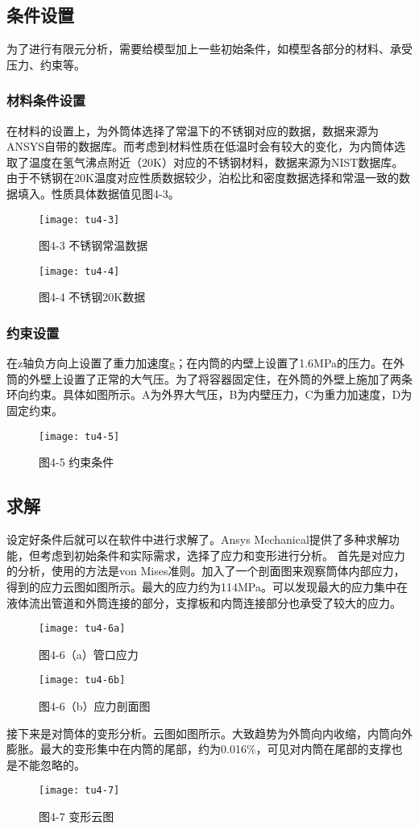 \documentclass[UTF8,a4paper]{ctexart}
\newcommand{\upcite}[1]{\textsuperscript{\textsuperscript{\cite{#1}}}}
\begin{document}
	\subsection{条件设置}
	为了进行有限元分析，需要给模型加上一些初始条件，如模型各部分的材料、承受压力、约束等。
	\subsubsection{材料条件设置}
	在材料的设置上，为外筒体选择了常温下的不锈钢对应的数据，数据来源为ANSYS自带的数据库。而考虑到材料性质在低温时会有较大的变化，为内筒体选取了温度在氢气沸点附近（20K）对应的不锈钢材料，数据来源为NIST数据库\upcite{ref21}。由于不锈钢在20K温度对应性质数据较少，泊松比和密度数据选择和常温一致的数据填入。性质具体数据值见图4-3。
	\begin{figure}[H]
		\centering
		\texttt{[image: tu4-3]}
		\caption*{图4-3 不锈钢常温数据}
		\label{fig:tu4-3}
	\end{figure}
	\begin{figure}[H]
		\centering
		\texttt{[image: tu4-4]}
		\caption*{图4-4 不锈钢20K数据}
		\label{fig:tu4-4}
	\end{figure}
	\subsubsection{约束设置}
	在z轴负方向上设置了重力加速度g；在内筒的内壁上设置了1.6MPa的压力。在外筒的外壁上设置了正常的大气压。为了将容器固定住，在外筒的外壁上施加了两条环向约束。具体如图所示。A为外界大气压，B为内壁压力，C为重力加速度，D为固定约束。
	\begin{figure}[H]
		\centering
		\texttt{[image: tu4-5]}
		\caption*{图4-5 约束条件}
		\label{fig:tu4-5}
	\end{figure}	
	\subsection{求解}
	设定好条件后就可以在软件中进行求解了。Ansys Mechanical提供了多种求解功能，但考虑到初始条件和实际需求，选择了应力和变形进行分析。
	首先是对应力的分析，使用的方法是von Mises准则。加入了一个剖面图来观察筒体内部应力，得到的应力云图如图所示。最大的应力约为114MPa。可以发现最大的应力集中在液体流出管道和外筒连接的部分，支撑板和内筒连接部分也承受了较大的应力。
	\begin{figure}[H]
		\centering
		\texttt{[image: tu4-6a]}
		\caption*{图4-6（a）管口应力}
		\label{fig:tu4-6a}
	\end{figure}
	\begin{figure}[H]
		\centering
		\texttt{[image: tu4-6b]}
		\caption*{图4-6（b）应力剖面图}
		\label{fig:tu4-6b}
	\end{figure}
	接下来是对筒体的变形分析。云图如图所示。大致趋势为外筒向内收缩，内筒向外膨胀。最大的变形集中在内筒的尾部，约为0.016\%，可见对内筒在尾部的支撑也是不能忽略的。
	\begin{figure}[H]
		\centering
		\texttt{[image: tu4-7]}
		\caption*{图4-7 变形云图}
		\label{fig:tu4-7}
	\end{figure}
\end{document}
